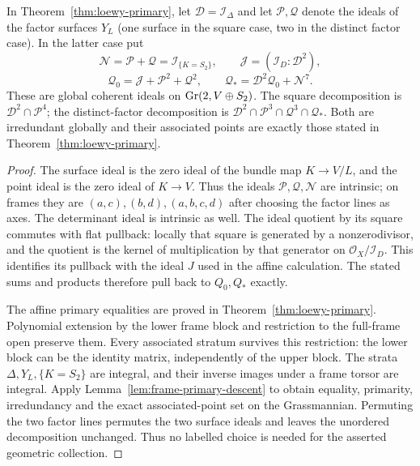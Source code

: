 \begin{corollary}
\label{cor:loewy-primary-descent}
In Theorem~\ref{thm:loewy-primary}, let $\mathcal D=\mathcal I_\Delta$
and let $\mathcal P,\mathcal Q$ denote the ideals of the factor
surfaces $Y_L$ (one surface in the square case, two in the distinct
factor case). In the latter case put
\[
 \mathcal N=\mathcal P+\mathcal Q=\mathcal I_{\{K=S_2\}},\qquad
 \mathcal J=(\mathcal I_D:\mathcal D^2),
\]
\[
 \mathcal Q_0=\mathcal J+\mathcal P^2+\mathcal Q^2,
 \qquad
 \mathcal Q_*=\mathcal D^2\mathcal Q_0+\mathcal N^7.
\]
These are global coherent ideals on $\operatorname{Gr}(2,V\oplus S_2)$.
The square decomposition is
$\mathcal D^2\cap\mathcal P^4$; the distinct-factor decomposition
is $\mathcal D^2\cap\mathcal P^3\cap\mathcal Q^3\cap\mathcal Q_*$.
Both are irredundant globally and their associated points are
exactly those stated in Theorem~\ref{thm:loewy-primary}.
\end{corollary}
\begin{proof}
The surface ideal is the zero ideal of the bundle map
$K\to V/L$, and the point ideal is the zero ideal of $K\to V$.
Thus the ideals $\mathcal P,\mathcal Q,\mathcal N$ are intrinsic;
on frames they are $(a,c),(b,d),(a,b,c,d)$ after choosing the
factor lines as axes. The determinant ideal is intrinsic as well.
The ideal quotient by its square commutes with flat pullback:
locally that square is generated by a nonzerodivisor, and the
quotient is the kernel of multiplication by that generator on
$\mathcal O_X/\mathcal I_D$. This identifies its pullback with
the ideal $J$ used in the affine calculation. The stated sums and
products therefore pull back to $Q_0,Q_*$ exactly.

The affine primary equalities are proved in
Theorem~\ref{thm:loewy-primary}. Polynomial extension by the lower
frame block and restriction to the full-frame open preserve them.
Every associated stratum survives this restriction: the lower block
can be the identity matrix, independently of the upper block.
The strata $\Delta,Y_L,\{K=S_2\}$ are integral, and their inverse
images under a frame torsor are integral. Apply
Lemma~\ref{lem:frame-primary-descent} to obtain equality, primarity,
irredundancy and the exact associated-point set on the Grassmannian.
Permuting the two factor lines permutes the two surface ideals and
leaves the unordered decomposition unchanged. Thus no labelled
choice is needed for the asserted geometric collection.
\end{proof}
